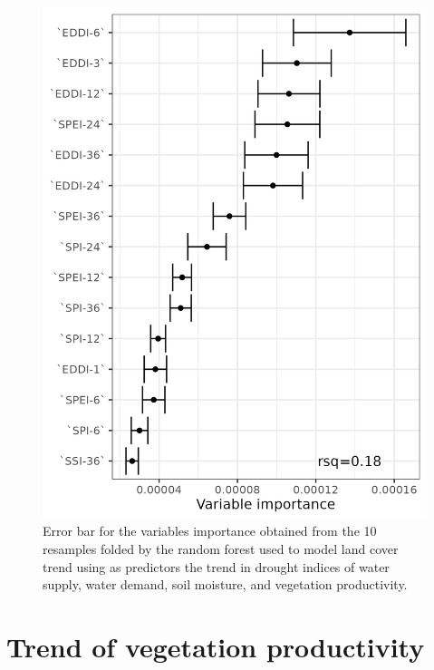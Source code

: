 \documentclass[
  authoryear,
  preprint,
  3p,
  onecolumn]{elsarticle}
\begin{document}
\begin{figure}[!ht]
\begin{minipage}{0.33\linewidth}
{\includegraphics[width=1\textwidth,height=\textheight]{figs/fig_errorbar_resample_random_forest_trends_Barren_land_norte grande.png}

}


\end{minipage}%

\caption{\label{fig-RF_importance}Error bar for the variables importance
obtained from the 10 resamples folded by the random forest used to model
land cover trend using as predictors the trend in drought indices of
water supply, water demand, soil moisture, and vegetation productivity.}

\end{figure}%

\section{Trend of vegetation
productivity}\label{trend-of-vegetation-productivity}
\end{document}
